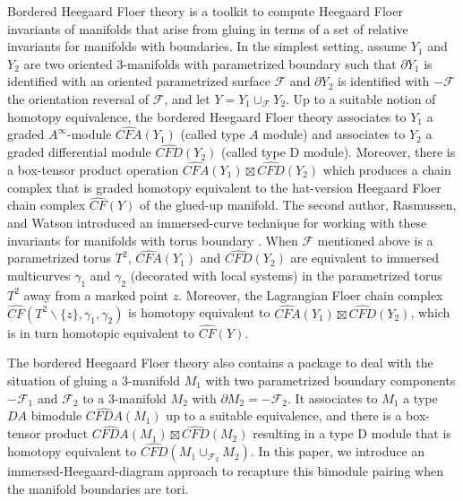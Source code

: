 \documentclass{amsart}
\theoremstyle{definition}
\theoremstyle{remark}
\numberwithin{equation}{section}
\numberwithin{equation}{section} \makeatletter
\begin{document}
Bordered Heegaard Floer theory is a toolkit to compute Heegaard Floer invariants of manifolds that arise from gluing in terms of a set of relative invariants for manifolds with boundaries. In the simplest setting, assume $Y_1$ and $Y_2$ are two oriented 3-manifolds with parametrized boundary such that $\partial Y_1$ is identified with an oriented parametrized surface $\mathcal{F}$ and $\partial Y_2$ is identified with $-\mathcal{F}$ the orientation reversal of $\mathcal{F}$, and let $Y=Y_1\cup_\mathcal{F}Y_2$. Up to a  suitable notion of homotopy equivalence, the bordered Heegaard Floer theory associates to $Y_1$ a graded $A^\infty$-module $\widehat{CFA}(Y_1)$ (called type $A$ module) and associates to $Y_2$ a graded differential module $\widehat{CFD}(Y_2)$ (called type D module). Moreover, there is a box-tensor product operation $\widehat{CFA}(Y_1)\boxtimes \widehat{CFD}(Y_2)$ which produces a chain complex that is graded homotopy equivalent to the hat-version Heegaard Floer chain complex $\widehat{CF}(Y)$ of the glued-up manifold. The second author, Rasmussen, and Watson introduced an immersed-curve technique for working with these invariants for manifolds with torus boundary \cite{hanselman2016bordered}. When $\mathcal{F}$ mentioned above is a parametrized torus $T^2$, $\widehat{CFA}(Y_1)$ and $\widehat{CFD}(Y_2)$ are equivalent to immersed multicurves $\gamma_1$ and $\gamma_2$ (decorated with local systems) in the parametrized torus $T^2$ away from a marked point $z$. Moreover, the Lagrangian Floer chain complex $\widehat{CF}(T^2\backslash \{z\},\gamma_1,\gamma_2)$ is homotopy equivalent to $\widehat{CFA}(Y_1)\boxtimes \widehat{CFD}(Y_2)$, which is in turn homotopic equivalent to $\widehat{CF}(Y)$.

The bordered Heegaard Floer theory also contains a package to deal with the situation of gluing a 3-manifold $M_1$ with two parametrized boundary components $-\mathcal{F}_1$ and $\mathcal{F}_2$ to a 3-manifold $M_2$ with $\partial M_2=-\mathcal{F}_2$. It associates to $M_1$ a type $DA$ bimodule $\widehat{CFDA}(M_1)$ up to a suitable equivalence, and there is a box-tensor product $\widehat{CFDA}(M_1)\boxtimes \widehat{CFD}(M_2)$ resulting in a type D module that is homotopy equivalent to $\widehat{CFD}(M_1\cup_{\mathcal{F}_2} M_2)$. In this paper, we introduce an immersed-Heegaard-diagram
approach to recapture this bimodule pairing when the manifold boundaries are tori.
\end{document}
